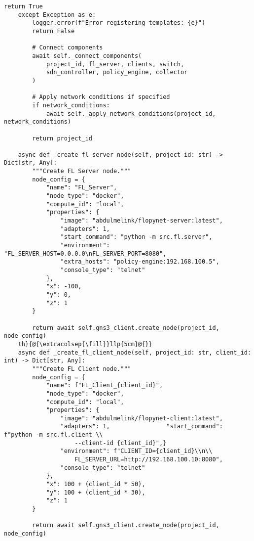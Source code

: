\begin{lstlisting}[style=pythoncode, caption=GNS3 Template Utilities]
        return True
    except Exception as e:
        logger.error(f"Error registering templates: {e}")
        return False
        
        # Connect components
        await self._connect_components(
            project_id, fl_server, clients, switch, 
            sdn_controller, policy_engine, collector
        )
        
        # Apply network conditions if specified
        if network_conditions:
            await self._apply_network_conditions(project_id, network_conditions)
        
        return project_id
    
    async def _create_fl_server_node(self, project_id: str) -> Dict[str, Any]:
        """Create FL Server node."""
        node_config = {
            "name": "FL_Server",
            "node_type": "docker",
            "compute_id": "local",
            "properties": {
                "image": "abdulmelink/flopynet-server:latest",
                "adapters": 1,
                "start_command": "python -m src.fl.server",
                "environment": "FL_SERVER_HOST=0.0.0.0\nFL_SERVER_PORT=8080",
                "extra_hosts": "policy-engine:192.168.100.5",
                "console_type": "telnet"
            },
            "x": -100,
            "y": 0,
            "z": 1
        }
        
        return await self.gns3_client.create_node(project_id, node_config)
    th}{@{\extracolsep{\fill}}llp{5cm}@{}}
    async def _create_fl_client_node(self, project_id: str, client_id: int) -> Dict[str, Any]:
        """Create FL Client node."""
        node_config = {
            "name": f"FL_Client_{client_id}",
            "node_type": "docker",
            "compute_id": "local",
            "properties": {
                "image": "abdulmelink/flopynet-client:latest",
                "adapters": 1,                "start_command": f"python -m src.fl.client \\
                    --client-id {client_id}",}
                "environment": f"CLIENT_ID={client_id}\\n\\
                    FL_SERVER_URL=http://192.168.100.10:8080",
                "console_type": "telnet"
            },
            "x": 100 + (client_id * 50),
            "y": 100 + (client_id * 30),
            "z": 1
        }
        
        return await self.gns3_client.create_node(project_id, node_config)
    

\end{lstlisting}
